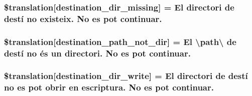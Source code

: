 \subsubsection[{\$translation}]{\setlength{\rightskip}{0pt plus 5cm}\$translation\mbox{[}\textquotesingle{}destination\+\_\+dir\+\_\+missing\textquotesingle{}\mbox{]} = \textquotesingle{}El directori de destí no existeix. No es pot continuar.\textquotesingle{}}\label{class_8upload_8ca___c_a_8php_a9ef28d3cf09942c6c0a1e77fa09185e8}
\hypertarget{class_8upload_8ca___c_a_8php_a5704a67137126e8c87b7a364175929d4}{}
\subsubsection[{\$translation}]{\setlength{\rightskip}{0pt plus 5cm}\$translation\mbox{[}\textquotesingle{}destination\+\_\+path\+\_\+not\+\_\+dir\textquotesingle{}\mbox{]} = \textquotesingle{}El \textbackslash{}\textquotesingle{}path\textbackslash{}\textquotesingle{} de destí no és un directori. No es pot continuar.\textquotesingle{}}\label{class_8upload_8ca___c_a_8php_a5704a67137126e8c87b7a364175929d4}
\hypertarget{class_8upload_8ca___c_a_8php_a97608ea194a616db49141a0e6dee900c}{}
\subsubsection[{\$translation}]{\setlength{\rightskip}{0pt plus 5cm}\$translation\mbox{[}\textquotesingle{}destination\+\_\+dir\+\_\+write\textquotesingle{}\mbox{]} = \textquotesingle{}El directori de destí no es pot obrir en escriptura. No es pot continuar.\textquotesingle{}}\label{class_8upload_8ca___c_a_8php_a97608ea194a616db49141a0e6dee900c}
\hypertarget{class_8upload_8ca___c_a_8php_a40e4e1962226b89fd76da5819a9602b0}{}
